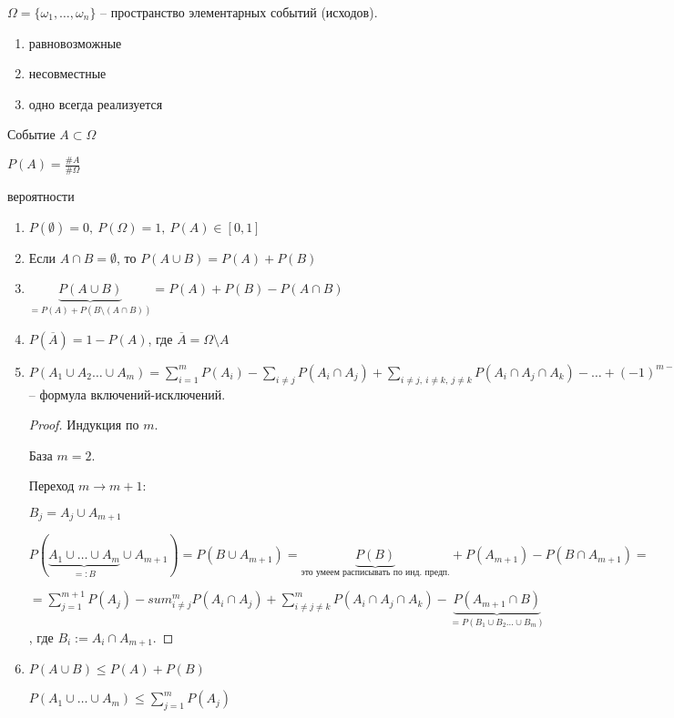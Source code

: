 
\begin{definition}
    $\Omega = \{ \omega_1, \dots, \omega_n \}$ -- пространство элементарных событий (исходов).

    \begin{enumerate}
        \item равновозможные
        \item несовместные
        \item одно всегда реализуется
    \end{enumerate}
\end{definition}

\begin{definition}
    Событие $A \subset \Omega$

    $P(A) = \frac{\#A}{\#\Omega}$
\end{definition}

\begin{properties} вероятности
    \begin{enumerate}
        \item $P(\emptyset) = 0, \ P(\Omega) = 1, \ P(A) \in [0, 1]$
        \item Если $A \cap B = \emptyset$, то $P(A \cup B) = P(A) + P(B)$
        \item $\underbrace{P(A \cup B)}_{= P(A) + P(B \setminus (A \cap B))} = P(A) + P(B) - P(A \cap B)$
        \item $P(\overline{A}) = 1 - P(A)$, где $\overline{A} = \Omega \setminus A$
        \item {
            $P(A_1 \cup A_2 \dots \cup A_m) = \sum_{i = 1}^{m} P(A_i) - \sum_{i \not = j} P(A_i \cap A_j) + \sum_{i \not = j, \ i \not = k, \ j \not = k} P(A_i \cap A_j \cap A_k) - \dots + (-1)^{m-1} \cdot P(A_1 \cap \dots \cap A_m)$ -- формула включений-исключений.

            \begin{proof}
                Индукция по $m$.
                
                База $m = 2$.

                Переход $m \rightarrow m + 1$:

                $B_j = A_j \cup A_{m + 1}$

                $P(\underbrace{A_1 \cup \dots \cup A_m}_{=: B} \cup A_{m + 1}) = P(B \cup A_{m+1}) = \underbrace{P(B)}_{\text{это умеем расписывать по инд. предп.}} + P(A_{m+1}) - P(B \cap A_{m + 1}) = $

                $= \sum_{j = 1}^{m+1} P(A_j) - sum_{i \not = j}^{m} P(A_i \cap A_j) + \sum_{i \not = j \not = k}^{m} P(A_i \cap A_j \cap A_k) - \underbrace{P(A_{m + 1} \cap B)}_{= P(B_1 \cup B_2 \dots \cup B_m)}$, где $B_i := A_i \cap A_{m + 1}$. 
            \end{proof}
        }
        \item {
            $P(A \cup B) \leq P(A) + P(B)$

            $P(A_1 \cup \dots \cup A_m) \leq \sum_{j = 1}^{m} P(A_j)$
        }
    \end{enumerate}
\end{properties}


